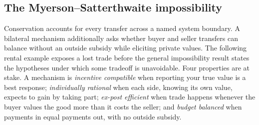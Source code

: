 \documentclass[11pt,a4paper]{article}
\theoremstyle{definition}
\theoremstyle{definition}
\theoremstyle{remark}
\begin{document}

\subsection{The Myerson--Satterthwaite impossibility}\label{sec:ms}

Conservation accounts for every transfer across a named system boundary.
A bilateral mechanism additionally asks whether buyer and seller transfers
can balance without an outside subsidy while eliciting private values. The
following rental example exposes a lost trade before the general impossibility
result states the hypotheses under which some tradeoff is unavoidable. Four
properties are at stake. A mechanism is \emph{incentive compatible} when
reporting your true value is a best response; \emph{individually rational}
when each side, knowing its own value, expects to gain by taking part;
\emph{ex-post efficient} when trade happens whenever the buyer values the
good more than it costs the seller; and \emph{budget balanced} when payments
in equal payments out, with no outside subsidy.
\end{document}

